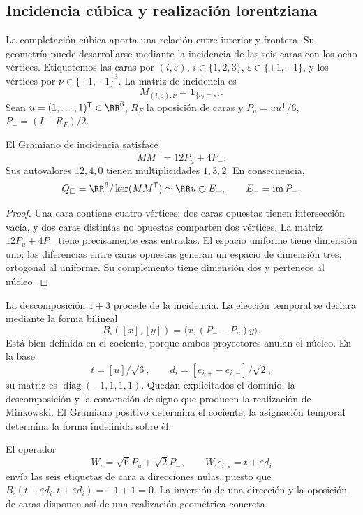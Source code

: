 \subsection{Incidencia cúbica y realización lorentziana}

La completación cúbica aporta una relación entre interior y frontera.
Su geometría puede desarrollarse mediante la incidencia de las seis caras
con los ocho vértices. Etiquetemos las caras por \((i,\varepsilon)\),
\(i\in\{1,2,3\}\), \(\varepsilon\in\{+1,-1\}\), y los vértices por
\(\nu\in\{+1,-1\}^3\). La matriz de incidencia es
\[
 M_{(i,\varepsilon),\nu}=\mathbf1_{\{\nu_i=\varepsilon\}}.
\]
Sean \(u=(1,\ldots,1)^{\mathsf T}\in\RR^6\), \(R_F\) la oposición de
caras y \(P_u=uu^{\mathsf T}/6\), \(P_-=(I-R_F)/2\).

\begin{proposition}
El Gramiano de incidencia satisface
\[
 MM^{\mathsf T}=12P_u+4P_-.
\]
Sus autovalores \(12,4,0\) tienen multiplicidades \(1,3,2\).
En consecuencia,
\[
 Q_\square=\RR^6/\ker(MM^{\mathsf T})
 \simeq\RR u\oplus E_-,\qquad E_-=\operatorname{im}P_-.
\]
\end{proposition}
\begin{proof}
Una cara contiene cuatro vértices; dos caras opuestas tienen intersección
vacía, y dos caras distintas no opuestas comparten dos vértices.
La matriz \(12P_u+4P_-\) tiene precisamente esas entradas.
El espacio uniforme tiene dimensión uno; las diferencias entre caras
opuestas generan un espacio de dimensión tres, ortogonal al uniforme.
Su complemento tiene dimensión dos y pertenece al núcleo.
\end{proof}

La descomposición \(1+3\) procede de la incidencia. La elección temporal
se declara mediante la forma bilineal
\[
 B_\square([x],[y])=\langle x,(P_--P_u)y\rangle.
\]
Está bien definida en el cociente, porque ambos proyectores anulan el
núcleo. En la base
\[
 t=[u]/\sqrt6,\qquad
 d_i=[e_{i,+}-e_{i,-}]/\sqrt2,
\]
su matriz es \(\operatorname{diag}(-1,1,1,1)\). Quedan explicitados
el dominio, la descomposición y la convención de signo que producen
la realización de Minkowski. El Gramiano positivo determina el cociente;
la asignación temporal determina la forma indefinida sobre él.

El operador
\[
 W_\square=\sqrt6P_u+\sqrt2P_-,\qquad
 W_\square e_{i,\varepsilon}=t+\varepsilon d_i
\]
envía las seis etiquetas de cara a direcciones nulas, puesto que
\(B_\square(t+\varepsilon d_i,t+\varepsilon d_i)=-1+1=0\).
La inversión de una dirección y la oposición de caras disponen así
de una realización geométrica concreta.

